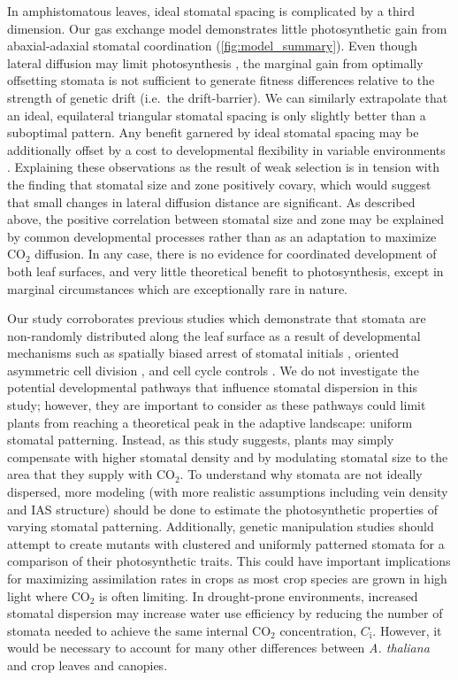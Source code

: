 \documentclass[webpdf,large,modern,unnumsec,namedate]{oup-authoring-template}
\begin{document}
In amphistomatous leaves, ideal stomatal spacing is complicated by a
third dimension. Our gas exchange model demonstrates little
photosynthetic gain from abaxial-adaxial stomatal coordination
(\autoref{fig:model_summary}). Even though lateral diffusion may limit
photosynthesis \citep{morison_lateral_2005}, the marginal gain from
optimally offsetting stomata is not sufficient to generate fitness
differences relative to the strength of genetic drift (i.e.~the
drift-barrier). We can similarly extrapolate that an ideal, equilateral
triangular stomatal spacing is only slightly better than a suboptimal
pattern. Any benefit garnered by ideal stomatal spacing may be
additionally offset by a cost to developmental flexibility in variable
environments
\citep{pillitteri_mechanisms_2012, baillie_developmental_2020}.
Explaining these observations as the result of weak selection is in
tension with the finding that stomatal size and zone positively covary,
which would suggest that small changes in lateral diffusion distance are
significant. As described above, the positive correlation between
stomatal size and zone may be explained by common developmental
processes rather than as an adaptation to maximize CO\(_2\) diffusion.
In any case, there is no evidence for coordinated development of both
leaf surfaces, and very little theoretical benefit to photosynthesis,
except in marginal circumstances which are exceptionally rare in nature.

Our study corroborates previous studies which demonstrate that stomata
are non-randomly distributed along the leaf surface as a result of
developmental mechanisms such as spatially biased arrest of stomatal
initials \citep{boetsch_arrest_1995}, oriented asymmetric cell division
\citep{geisler_oriented_2000}, and cell cycle controls
\citep{croxdale_stomatal_2000}. We do not investigate the potential
developmental pathways that influence stomatal dispersion in this study;
however, they are important to consider as these pathways could limit
plants from reaching a theoretical peak in the adaptive landscape:
uniform stomatal patterning. Instead, as this study suggests, plants may
simply compensate with higher stomatal density and by modulating
stomatal size to the area that they supply with CO\(_2\). To understand
why stomata are not ideally dispersed, more modeling (with more
realistic assumptions including vein density and IAS structure) should
be done to estimate the photosynthetic properties of varying stomatal
patterning. Additionally, genetic manipulation studies should attempt to
create mutants with clustered and uniformly patterned stomata for a
comparison of their photosynthetic traits. This could have important
implications for maximizing assimilation rates in crops as most crop
species are grown in high light where CO\(_2\) is often limiting. In
drought-prone environments, increased stomatal dispersion may increase
water use efficiency by reducing the number of stomata needed to achieve
the same internal CO\(_2\) concentration, \(C_\text{i}\). However, it
would be necessary to account for many other differences between
\emph{A. thaliana} and crop leaves and canopies.
\end{document}
